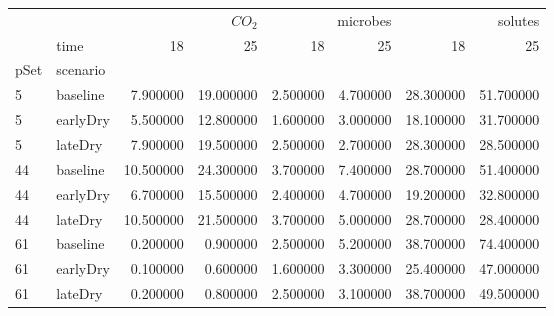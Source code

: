 \begin{tabular}{llrrrrrr}
 &  & \multicolumn{2}{r}{$CO_2$} & \multicolumn{2}{r}{microbes} & \multicolumn{2}{r}{solutes} \\
 & time & 18 & 25 & 18 & 25 & 18 & 25 \\
pSet & scenario &  &  &  &  &  &  \\
5 & baseline & 7.900000 & 19.000000 & 2.500000 & 4.700000 & 28.300000 & 51.700000 \\
5 & earlyDry & 5.500000 & 12.800000 & 1.600000 & 3.000000 & 18.100000 & 31.700000 \\
5 & lateDry & 7.900000 & 19.500000 & 2.500000 & 2.700000 & 28.300000 & 28.500000 \\
44 & baseline & 10.500000 & 24.300000 & 3.700000 & 7.400000 & 28.700000 & 51.400000 \\
44 & earlyDry & 6.700000 & 15.500000 & 2.400000 & 4.700000 & 19.200000 & 32.800000 \\
44 & lateDry & 10.500000 & 21.500000 & 3.700000 & 5.000000 & 28.700000 & 28.400000 \\
61 & baseline & 0.200000 & 0.900000 & 2.500000 & 5.200000 & 38.700000 & 74.400000 \\
61 & earlyDry & 0.100000 & 0.600000 & 1.600000 & 3.300000 & 25.400000 & 47.000000 \\
61 & lateDry & 0.200000 & 0.800000 & 2.500000 & 3.100000 & 38.700000 & 49.500000 \\
\end{tabular}
